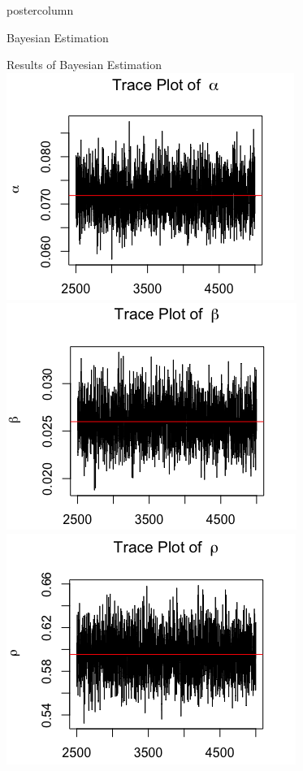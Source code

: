 \documentclass[final]{beamer}\usepackage[]{graphicx}\usepackage[]{color}
\begin{document}
{\begin{frame}
\begin{columns}
\begin{column}{.33\textwidth}
\begin{beamercolorbox}[center,wd=\textwidth]{postercolumn}
\begin{minipage}[T]{.97\textwidth}
{\begin{block}{Bayesian Estimation}
\end{block}
\vfill
\begin{block}{Results of Bayesian Estimation}
\vspace{0.3cm}
  \includegraphics[scale=0.8]{TP of a.png}
  \includegraphics[scale=0.8]{TP of b.png}
  \includegraphics[scale=0.8]{TP of p.png}\\

\end{block}}
\end{minipage}
\end{beamercolorbox}
\end{column}
\end{columns}
\end{frame}}
\end{document}
